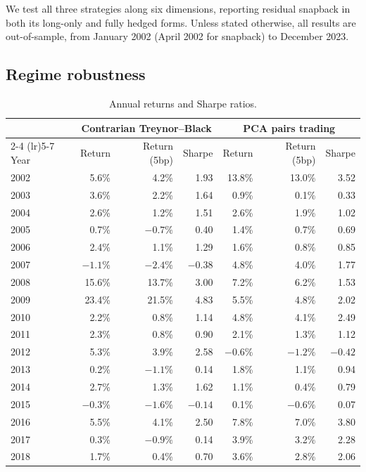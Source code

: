 \documentclass[12pt,letterpaper]{article}
\begin{document}
We test all three strategies along six dimensions, reporting residual snapback in both its long-only and fully hedged forms. Unless stated otherwise, all results are out-of-sample, from January 2002 (April 2002 for snapback) to December 2023.

\subsection{Regime robustness}

\begin{table}[H]
\centering
\caption{Annual returns and Sharpe ratios.}
\label{tab:yearly}
\begin{tabular}{lrrrrrr}
\toprule
& \multicolumn{3}{c}{Contrarian Treynor--Black} & \multicolumn{3}{c}{PCA pairs trading} \\
\cmidrule(lr){2-4} \cmidrule(lr){5-7}
Year & Return & Return (5bp) & Sharpe & Return & Return (5bp) & Sharpe \\
\midrule
2002 & 5.6\% & 4.2\% & 1.93 & 13.8\% & 13.0\% & 3.52 \\
2003 & 3.6\% & 2.2\% & 1.64 & 0.9\% & 0.1\% & 0.33 \\
2004 & 2.6\% & 1.2\% & 1.51 & 2.6\% & 1.9\% & 1.02 \\
2005 & 0.7\% & $-0.7\%$ & 0.40 & 1.4\% & 0.7\% & 0.69 \\
2006 & 2.4\% & 1.1\% & 1.29 & 1.6\% & 0.8\% & 0.85 \\
2007 & $-1.1\%$ & $-2.4\%$ & $-0.38$ & 4.8\% & 4.0\% & 1.77 \\
2008 & 15.6\% & 13.7\% & 3.00 & 7.2\% & 6.2\% & 1.53 \\
2009 & 23.4\% & 21.5\% & 4.83 & 5.5\% & 4.8\% & 2.02 \\
2010 & 2.2\% & 0.8\% & 1.14 & 4.8\% & 4.1\% & 2.49 \\
2011 & 2.3\% & 0.8\% & 0.90 & 2.1\% & 1.3\% & 1.12 \\
2012 & 5.3\% & 3.9\% & 2.58 & $-0.6\%$ & $-1.2\%$ & $-0.42$ \\
2013 & 0.2\% & $-1.1\%$ & 0.14 & 1.8\% & 1.1\% & 0.94 \\
2014 & 2.7\% & 1.3\% & 1.62 & 1.1\% & 0.4\% & 0.79 \\
2015 & $-0.3\%$ & $-1.6\%$ & $-0.14$ & 0.1\% & $-0.6\%$ & 0.07 \\
2016 & 5.5\% & 4.1\% & 2.50 & 7.8\% & 7.0\% & 3.80 \\
2017 & 0.3\% & $-0.9\%$ & 0.14 & 3.9\% & 3.2\% & 2.28 \\
2018 & 1.7\% & 0.4\% & 0.70 & 3.6\% & 2.8\% & 2.06 \\

\end{tabular}
\end{table}
\end{document}
